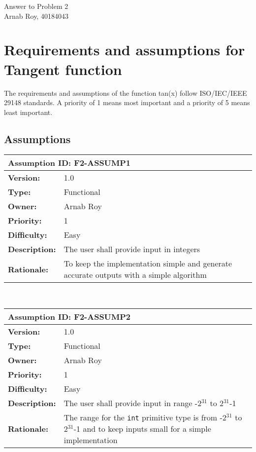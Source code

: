 \documentclass[12pt]{article}
\begin{document}
\begin{center}
    \huge{Answer to Problem 2} \\
    \large{Arnab Roy, 40184043}
\end{center}

\section{Requirements and assumptions for Tangent function}
The requirements and assumptions of the function tan(x) follow ISO/IEC/IEEE 29148 standards. A priority of 1 means most important and a priority of 5 means least important.
\subsection{Assumptions}
\begin{tabular}{ |p{4cm} | p{10cm}| }
 \hline
 \multicolumn{2}{|l|}{\textbf{Assumption ID: F2-ASSUMP1}} \\
 \hline
 \textbf{Version:} & 1.0\\
 \textbf{Type:} & Functional\\
 \textbf{Owner:} & Arnab Roy\\
 \textbf{Priority:} & 1\\
 \textbf{Difficulty:} & Easy\\
 \textbf{Description:} & The user shall provide input in integers \\
 \textbf{Rationale:} & To keep the implementation simple and generate accurate outputs with a simple algorithm \\
 \hline
\end{tabular}
\\[10pt]
\begin{tabular}{ |p{4cm} | p{10cm}| }
 \hline
 \multicolumn{2}{|l|}{\textbf{Assumption ID: F2-ASSUMP2}} \\
 \hline
 \textbf{Version:} & 1.0\\
 \textbf{Type:} & Functional\\
 \textbf{Owner:} & Arnab Roy\\
 \textbf{Priority:} & 1\\
 \textbf{Difficulty:} & Easy\\
 \textbf{Description:} & The user shall provide input in range -2$^{31}$ to 2$^{31}$-1 \\
 \textbf{Rationale:} & The range for the \texttt{int} primitive type is from -2$^{31}$ to 2$^{31}$-1 and to keep inputs small for a simple implementation\\
 \hline
\end{tabular}
\end{document}
